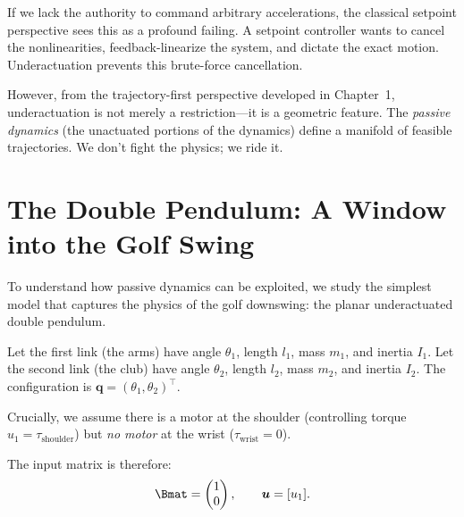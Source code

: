 \documentclass[12pt, openany]{book}
\theoremstyle{plain}
\newcommand{\control}{\bm{u}}
\begin{document}
If we lack the authority to command arbitrary accelerations, the classical setpoint perspective sees this as a profound failing. A setpoint controller wants to cancel the nonlinearities, feedback-linearize the system, and dictate the exact motion. Underactuation prevents this brute-force cancellation. 

However, from the trajectory-first perspective developed in Chapter~1, underactuation is not merely a restriction---it is a geometric feature. The \emph{passive dynamics} (the unactuated portions of the dynamics) define a manifold of feasible trajectories. We don't fight the physics; we ride it. 

\section{The Double Pendulum: A Window into the Golf Swing}

To understand how passive dynamics can be exploited, we study the simplest model that captures the physics of the golf downswing: the planar underactuated double pendulum.

Let the first link (the arms) have angle $\theta_1$, length $l_1$, mass $m_1$, and inertia $I_1$. Let the second link (the club) have angle $\theta_2$, length $l_2$, mass $m_2$, and inertia $I_2$. The configuration is $\bm{q} = (\theta_1, \theta_2)^\top$.

Crucially, we assume there is a motor at the shoulder (controlling torque $u_1 = \tau_{\text{shoulder}}$) but \emph{no motor} at the wrist ($\tau_{\text{wrist}} = 0$).

The input matrix is therefore:
\begin{equation}
  \Bmat = \begin{pmatrix} 1 \\ 0 \end{pmatrix}, \qquad \control = [u_1].
\end{equation}
\end{document}
